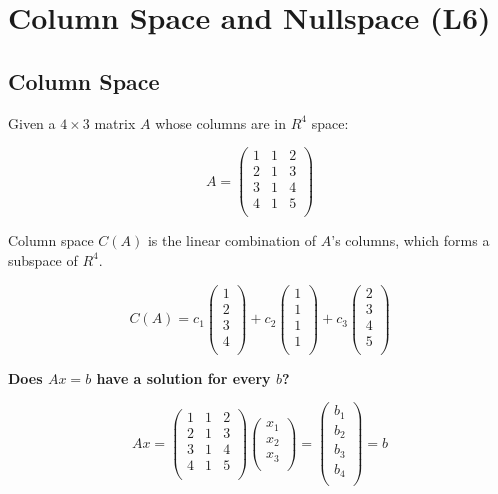 \documentclass[12pt]{article}
\begin{document}
\section{Column Space and Nullspace (L6)}

\subsection{Column Space}

Given a $4\times3$ matrix $A$ whose columns are in $R^4$ space:

\[
A=
\left(
    \begin{matrix}
        1 & 1 & 2\\ 
        2 & 1 & 3\\
        3 & 1 & 4\\
        4 & 1 & 5\\
    \end{matrix}
\right)
\]

Column space $C(A)$ is the linear combination of $A$'s columns, which forms a subspace of $R^4$.

\[
C(A)=
c_1
\left(
    \begin{matrix}
        1\\ 
        2\\
        3\\
        4\\
    \end{matrix}
\right)
+ c_2
\left(
    \begin{matrix}
        1\\ 
        1\\
        1\\
        1\\
    \end{matrix}
\right)
+ c_3
\left(
    \begin{matrix}
        2\\ 
        3\\
        4\\
        5\\
    \end{matrix}
\right)
\]

\textbf{Does $Ax=b$ have a solution for every $b$?}

\[
Ax=
\left(
    \begin{matrix}
        1 & 1 & 2\\ 
        2 & 1 & 3\\
        3 & 1 & 4\\
        4 & 1 & 5\\
    \end{matrix}
\right)
\left(
    \begin{matrix}
        x_1\\ 
        x_2\\
        x_3\\
    \end{matrix}
\right)
=
\left(
    \begin{matrix}
        b_1\\ 
        b_2\\
        b_3\\
        b_4\\
    \end{matrix}
\right)
=b
\]
\end{document}

